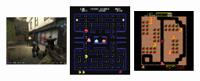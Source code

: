 \begin{large}
\begin{itemize}
\includegraphics[width=0.15\textwidth, height=10cm]{figures/fps.jpg}
\includegraphics[width=0.15\textwidth, height=10cm]{figures/pacman.jpg}
\includegraphics[width=0.15\textwidth, height=10cm]{figures/do.png}


\end{itemize}
\end{large}
